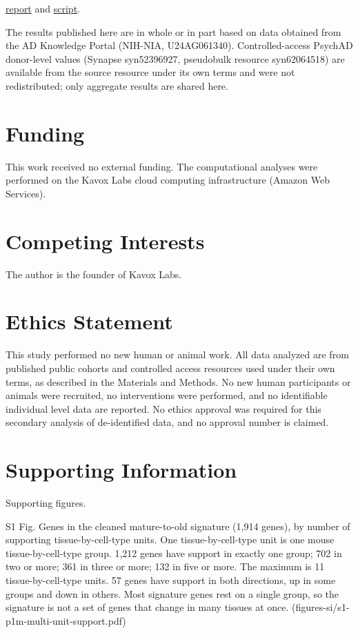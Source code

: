 \documentclass[11pt]{article}
\begin{document}
\href{https://github.com/Abolfazl-Alipour/agescape/blob/mature-to-old-final-2026-11-23/reports/followup-11pt-block10-benchmark.md}{report} and \href{https://github.com/Abolfazl-Alipour/agescape/blob/mature-to-old-final-2026-11-23/scripts/run_followup_11pt_block10_published_benchmark.py}{script}.

The results published here are in whole or in part based on data obtained from the AD Knowledge Portal (NIH-NIA, U24AG061340). Controlled-access PsychAD donor-level values (Synapse syn52396927, pseudobulk resource syn62064518) are available from the source resource under its own terms and were not redistributed; only aggregate results are shared here.

\section*{Funding}

This work received no external funding. The computational analyses were performed on the Kavox Labs cloud computing infrastructure (Amazon Web Services).

\section*{Competing Interests}

The author is the founder of Kavox Labs.

\section*{Ethics Statement}

This study performed no new human or animal work. All data analyzed are from published public cohorts and controlled access resources used under their own terms, as described in the Materials and Methods. No new human participants or animals were recruited, no interventions were performed, and no identifiable individual level data are reported. No ethics approval was required for this secondary analysis of de-identified data, and no approval number is claimed.

\section*{Supporting Information}

Supporting figures.

S1 Fig. Genes in the cleaned mature-to-old signature (1,914 genes), by number of supporting tissue-by-cell-type units. One tissue-by-cell-type unit is one mouse tissue-by-cell-type group. 1,212 genes have support in exactly one group; 702 in two or more; 361 in three or more; 132 in five or more. The maximum is 11 tissue-by-cell-type units. 57 genes have support in both directions, up in some groups and down in others. Most signature genes rest on a single group, so the signature is not a set of genes that change in many tissues at once. (figures-si/s1-p1m-multi-unit-support.pdf)
\end{document}
